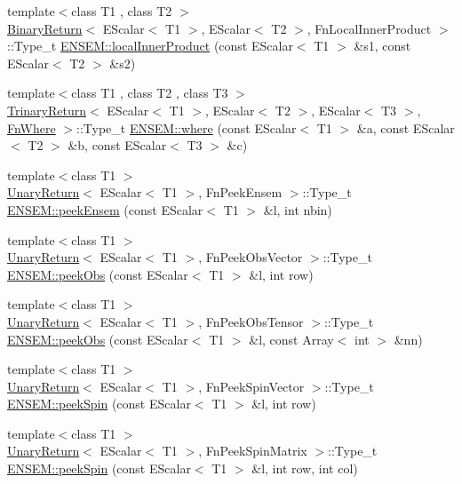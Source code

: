 \begin{DoxyCompactItemize}
\item 
{\footnotesize template$<$class T1 , class T2 $>$ }\\\mbox{\hyperlink{structBinaryReturn}{Binary\+Return}}$<$ E\+Scalar$<$ T1 $>$, E\+Scalar$<$ T2 $>$, Fn\+Local\+Inner\+Product $>$\+::Type\+\_\+t \mbox{\hyperlink{group__escalar_ga0013b1f4312c45e970912e4df1f55f65}{E\+N\+S\+E\+M\+::local\+Inner\+Product}} (const E\+Scalar$<$ T1 $>$ \&s1, const E\+Scalar$<$ T2 $>$ \&s2)
\item 
{\footnotesize template$<$class T1 , class T2 , class T3 $>$ }\\\mbox{\hyperlink{structTrinaryReturn}{Trinary\+Return}}$<$ E\+Scalar$<$ T1 $>$, E\+Scalar$<$ T2 $>$, E\+Scalar$<$ T3 $>$, \mbox{\hyperlink{structFnWhere}{Fn\+Where}} $>$\+::Type\+\_\+t \mbox{\hyperlink{group__escalar_ga1b68bb6fff59089642921a334fde6ef5}{E\+N\+S\+E\+M\+::where}} (const E\+Scalar$<$ T1 $>$ \&a, const E\+Scalar$<$ T2 $>$ \&b, const E\+Scalar$<$ T3 $>$ \&c)
\item 
{\footnotesize template$<$class T1 $>$ }\\\mbox{\hyperlink{structUnaryReturn}{Unary\+Return}}$<$ E\+Scalar$<$ T1 $>$, Fn\+Peek\+Ensem $>$\+::Type\+\_\+t \mbox{\hyperlink{group__escalar_ga8fd0207eefa0fd0836dc3f2dffef209e}{E\+N\+S\+E\+M\+::peek\+Ensem}} (const E\+Scalar$<$ T1 $>$ \&l, int nbin)
\item 
{\footnotesize template$<$class T1 $>$ }\\\mbox{\hyperlink{structUnaryReturn}{Unary\+Return}}$<$ E\+Scalar$<$ T1 $>$, Fn\+Peek\+Obs\+Vector $>$\+::Type\+\_\+t \mbox{\hyperlink{group__escalar_ga7b3199ffdfb57391566d3db05e9b38c1}{E\+N\+S\+E\+M\+::peek\+Obs}} (const E\+Scalar$<$ T1 $>$ \&l, int row)
\item 
{\footnotesize template$<$class T1 $>$ }\\\mbox{\hyperlink{structUnaryReturn}{Unary\+Return}}$<$ E\+Scalar$<$ T1 $>$, Fn\+Peek\+Obs\+Tensor $>$\+::Type\+\_\+t \mbox{\hyperlink{group__escalar_ga5715083f9573c91b9d4567559f4b2b30}{E\+N\+S\+E\+M\+::peek\+Obs}} (const E\+Scalar$<$ T1 $>$ \&l, const Array$<$ int $>$ \&nn)
\item 
{\footnotesize template$<$class T1 $>$ }\\\mbox{\hyperlink{structUnaryReturn}{Unary\+Return}}$<$ E\+Scalar$<$ T1 $>$, Fn\+Peek\+Spin\+Vector $>$\+::Type\+\_\+t \mbox{\hyperlink{group__escalar_gaa833c21339250a427d537f2c3431f9e2}{E\+N\+S\+E\+M\+::peek\+Spin}} (const E\+Scalar$<$ T1 $>$ \&l, int row)
\item 
{\footnotesize template$<$class T1 $>$ }\\\mbox{\hyperlink{structUnaryReturn}{Unary\+Return}}$<$ E\+Scalar$<$ T1 $>$, Fn\+Peek\+Spin\+Matrix $>$\+::Type\+\_\+t \mbox{\hyperlink{group__escalar_gadd6441efc37438418dda6c0e5a501f10}{E\+N\+S\+E\+M\+::peek\+Spin}} (const E\+Scalar$<$ T1 $>$ \&l, int row, int col)

\end{DoxyCompactItemize}
